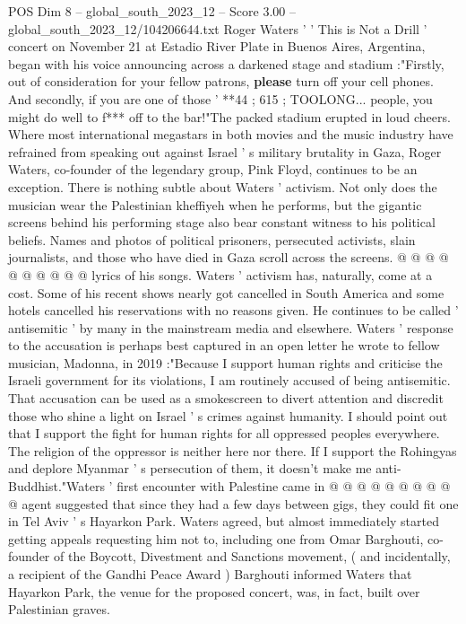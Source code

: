\begin{textsample}{POS Dim 8 – global\_south\_2023\_12 – Score 3.00 – global\_south\_2023\_12/104206644.txt}  \label{ex:f8_pos_434}
Roger Waters ' ' This is Not a Drill ' concert on November 21 at Estadio River Plate in Buenos Aires, Argentina, began with his voice announcing across a darkened stage and stadium :"Firstly, out of consideration for your fellow patrons, \textbf{please} turn off your cell phones.
And secondly, if you are one of those ' **44 ; 615 ; TOOLONG... people, you might do well to f*** off to the bar!"The packed stadium erupted in loud cheers.
Where most international megastars in both movies and the music industry have refrained from speaking out against Israel ' s military brutality in Gaza, Roger Waters, co-founder of the legendary group, Pink Floyd, continues to be an exception.
There is nothing subtle about Waters ' activism.
Not only does the musician wear the Palestinian kheffiyeh when he performs, but the gigantic screens behind his performing stage also bear constant witness to his political beliefs.
Names and photos of political prisoners, persecuted activists, slain journalists, and those who have died in Gaza scroll across the screens. @ @ @ @ @ @ @ @ @ @ lyrics of his songs.
Waters ' activism has, naturally, come at a cost.
Some of his recent shows nearly got cancelled in South America and some hotels cancelled his reservations with no reasons given.
He continues to be called ' antisemitic ' by many in the mainstream media and elsewhere.
Waters ' response to the accusation is perhaps best captured in an open letter he wrote to fellow musician, Madonna, in 2019 :"Because I support human rights and criticise the Israeli government for its violations, I am routinely accused of being antisemitic.
That accusation can be used as a smokescreen to divert attention and discredit those who shine a light on Israel ' s crimes against humanity.
I should point out that I support the fight for human rights for all oppressed peoples everywhere.
The religion of the oppressor is neither here nor there.
If I support the Rohingyas and deplore Myanmar ' s persecution of them, it doesn't make me anti-Buddhist."Waters ' first encounter with Palestine came in @ @ @ @ @ @ @ @ @ @ agent suggested that since they had a few days between gigs, they could fit one in Tel Aviv ' s Hayarkon Park.
Waters agreed, but almost immediately started getting appeals requesting him not to, including one from Omar Barghouti, co-founder of the Boycott, Divestment and Sanctions movement, ( and incidentally, a recipient of the Gandhi Peace Award ) Barghouti informed Waters that Hayarkon Park, the venue for the proposed concert, was, in fact, built over Palestinian graves.

\end{textsample}
